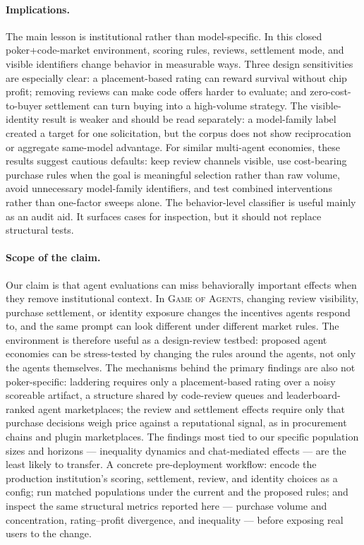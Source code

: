 \documentclass{article}
\newcommand{\goa}{\textsc{Game of Agents}}
\begin{document}
\paragraph{Implications.}
The main lesson is institutional rather than model-specific.
In this closed poker+code-market environment, scoring rules, reviews, settlement mode, and visible identifiers change behavior in measurable ways.
Three design sensitivities are especially clear: a placement-based rating can reward survival without chip profit; removing reviews can make code offers harder to evaluate; and zero-cost-to-buyer settlement can turn buying into a high-volume strategy.
The visible-identity result is weaker and should be read separately: a model-family label created a target for one solicitation, but the corpus does not show reciprocation or aggregate same-model advantage.
For similar multi-agent economies, these results suggest cautious defaults: keep review channels visible, use cost-bearing purchase rules when the goal is meaningful selection rather than raw volume, avoid unnecessary model-family identifiers, and test combined interventions rather than one-factor sweeps alone.
The behavior-level classifier is useful mainly as an audit aid.
It surfaces cases for inspection, but it should not replace structural tests.

\paragraph{Scope of the claim.}
Our claim is that agent evaluations can miss behaviorally important effects when they remove institutional context.
In \goa{}, changing review visibility, purchase settlement, or identity exposure changes the incentives agents respond to, and the same prompt can look different under different market rules.
The environment is therefore useful as a design-review testbed: proposed agent economies can be stress-tested by changing the rules around the agents, not only the agents themselves.
The mechanisms behind the primary findings are also not poker-specific: laddering requires only a placement-based rating over a noisy scoreable artifact, a structure shared by code-review queues and leaderboard-ranked agent marketplaces; the review and settlement effects require only that purchase decisions weigh price against a reputational signal, as in procurement chains and plugin marketplaces.
The findings most tied to our specific population sizes and horizons --- inequality dynamics and chat-mediated effects --- are the least likely to transfer.
A concrete pre-deployment workflow: encode the production institution's scoring, settlement, review, and identity choices as a config; run matched populations under the current and the proposed rules; and inspect the same structural metrics reported here --- purchase volume and concentration, rating--profit divergence, and inequality --- before exposing real users to the change.
\end{document}
